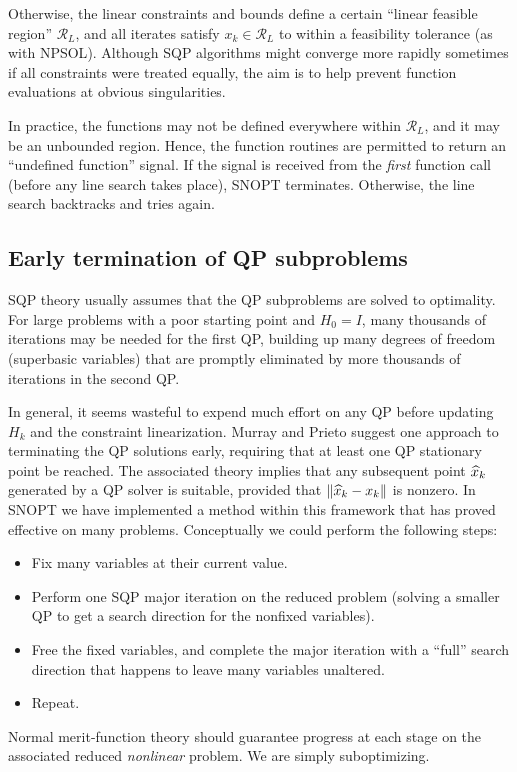 \documentclass[draft,leqno,onefignum,onetabnum]{siamltex}
\def\norm#1{\|#1\|}
\def\xhat{\skew{2.8}\widehat x}
\def\RL {\ensuremath{\mathcal{R}_L}}   %
\def\NPSOL {{\small NPSOL}}
\def\SNOPT {{\small SNOPT}}
\begin{document}
Otherwise, the linear constraints and bounds define a certain
``linear feasible region'' \RL, and all iterates satisfy $x_k \in \RL$
to within a feasibility tolerance (as with \NPSOL)\@.
Although SQP algorithms might converge more rapidly sometimes
if all constraints were treated equally, the aim is to help prevent
function evaluations at obvious singularities.

In practice, the functions may not be defined everywhere
within \RL, and it may be an unbounded region.
Hence, the function routines are permitted to return an
``undefined function'' signal.  If the signal is received from the \emph{first}
function call (before any line search takes place), \SNOPT{} terminates.
Otherwise, the line search backtracks and tries again.


\subsection{Early termination of QP subproblems}  \label{sec-EarlyTerm}

SQP theory usually assumes that the QP subproblems are solved
to optimality.  For large problems with a poor starting point
and $H_0 = I$, many thousands of iterations may be needed for the
first QP, building up many degrees of freedom (superbasic variables)
that are promptly eliminated by more thousands of iterations
in the second QP\@.

In general, it seems wasteful to expend much effort on any QP
before updating $H_k$ and the constraint linearization.
Murray and Prieto \cite{MurP95} suggest one approach to terminating
the QP solutions early, requiring that at least one QP stationary point
be reached.  The associated theory implies that any subsequent point $\xhat_k$
generated by a QP solver is suitable, provided that $\norm{\xhat_k - x_k}$ is nonzero.
In \SNOPT{} we have implemented a method within this framework
that has proved effective on many problems.
Conceptually we could perform the following steps:
\begin{itemize}
\item Fix many variables at their current value.
\item Perform one SQP major iteration on the reduced problem
      (solving a smaller QP to get a search direction
      for the nonfixed variables).
\item Free the fixed variables, and complete the major iteration
      with a ``full'' search direction that happens to leave
      many variables unaltered.
\item Repeat.
\end{itemize}
%
Normal merit-function theory should guarantee progress
at each stage on the associated reduced \emph{nonlinear} problem.
We are simply suboptimizing.
\end{document}
